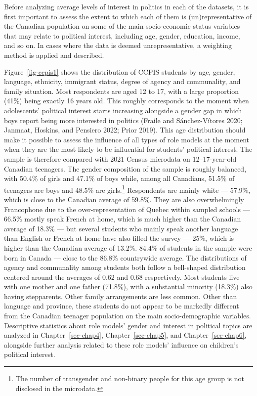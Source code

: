 \documentclass[
  letterpaper,
  DIV=11,
  numbers=noendperiod]{scrreprt}
\begin{document}
Before analyzing average levels of interest in politics in each of the
datasets, it is first important to assess the extent to which each of
them is (un)representative of the Canadian population on some of the
main socio-economic status variables that may relate to political
interest, including age, gender, education, income, and so on. In cases
where the data is deemed unrepresentative, a weighting method is applied
and described.

Figure~\ref{fig-ccpis1} shows the distribution of CCPIS students by age,
gender, language, ethnicity, immigrant status, degree of agency and
communality, and family situation. Most respondents are aged 12 to 17,
with a large proportion (41\%) being exactly 16 years old. This roughly
corresponds to the moment when adolescents' political interest starts
increasing alongside a gender gap in which boys report being more
interested in politics (Fraile and Sánchez-Vítores 2020; Janmaat,
Hoskins, and Pensiero 2022; Prior 2019). This age distribution should
make it possible to assess the influence of all types of role models at
the moment when they are the most likely to be influential for students'
political interest. The sample is therefore compared with 2021 Census
microdata on 12--17-year-old Canadian teenagers. The gender composition
of the sample is roughly balanced, with 50.4\% of girls and 47.1\% of
boys while, among all Canadians, 51.5\% of teenagers are boys and 48.5\%
are girls.\footnote{The number of transgender and non-binary people for
  this age group is not disclosed in the microdata.} Respondents are
mainly white --- 57.9\%, which is close to the Canadian average of
59.8\%. They are also overwhelmingly Francophone due to the
over-representation of Quebec within sampled schools --- 66.5\% mostly
speak French at home, which is much higher than the Canadian average of
18.3\% --- but several students who mainly speak another language than
English or French at home have also filled the survey --- 25\%, which is
higher than the Canadian average of 13.2\%. 84.4\% of students in the
sample were born in Canada --- close to the 86.8\% countrywide average.
The distributions of agency and communality among students both follow a
bell-shaped distribution centered around the averages of 0.62 and 0.68
respectively. Most students live with one mother and one father
(71.8\%), with a substantial minority (18.3\%) also having stepparents.
Other family arrangements are less common. Other than language and
province, these students do not appear to be markedly different from the
Canadian teenager population on the main socio-demographic variables.
Descriptive statistics about role models' gender and interest in
political topics are analyzed in Chapter~\ref{sec-chap4},
Chapter~\ref{sec-chap5}, and Chapter~\ref{sec-chap6}, alongside further
analysis related to these role models' influence on children's political
interest.
\end{document}
